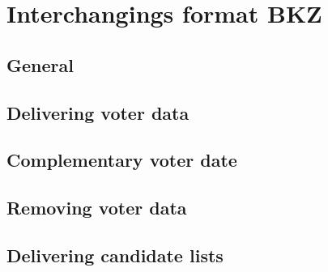 \chapter{Interchangings format BKZ}\label{cha:interch-form-bkz}

\section{General}\label{sec6:general}

\section{Delivering voter data}\label{sec6:deliv-voter-data}

\section{Complementary voter date}\label{sec6:compl-voter-date}

\section{Removing voter data}\label{sec6:removing-voter-data}

\section{Delivering candidate lists}\label{sec6:deliv-cand-lists}

